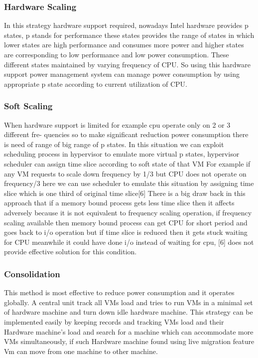 \documentclass[seminar,twoside]{iitbreport}
\begin{document}
\subsubsection{Hardware Scaling}
In this strategy hardware support required, nowadays Intel hardware provides p states, p
stands for performance these states provides the range of states in which lower states are
high performance and consumes more power and higher states are corresponding to low
performance and low power consumption. These different states maintained by varying
frequency of CPU. So using this hardware support power management system can manage
power consumption by using appropriate p state according to current utilization of CPU.
\subsubsection{Soft Scaling}
When hardware support is limited for example cpu operate only on 2 or 3 different fre-
quencies so to make significant reduction power consumption there is need of range of
big range of p states. In this situation we can exploit scheduling process in hypervisor
to emulate more virtual p states, hypervisor scheduler can assign time slice according to
soft state of that VM For example if any VM requests to scale down frequency by 1/3 but
CPU does not operate on frequency/3 here we can use scheduler to emulate this situation
by assigning time slice which is one third of original time slice[6] There is a big draw
back in this approach that if a memory bound process gets less time slice then it affects
adversely because it is not equivalent to frequency scaling operation, if frequency scaling
available then memory bound process can get CPU for short period and goes back
to i/o operation but if time slice is reduced then it gets stuck waiting for CPU meanwhile
it could have done i/o instead of waiting for cpu, [6] does not provide effective solution for
this condition.
\subsubsection{Consolidation}
This method is most effective to reduce power consumption and it operates globally. A
central unit track all VMs load and tries to run VMs in a minimal set of hardware machine 
and turn down idle hardware machine. This strategy can be implemented easily by
keeping records and tracking VMs load and their Hardware machine’s load and search for
a machine which can accommodate more VMs simultaneously, if such Hardware machine
found using live migration feature Vm can move from one machine to other machine.
\end{document}
